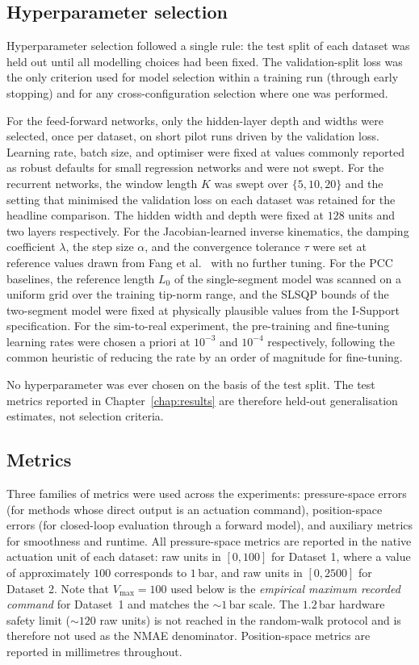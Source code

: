 \subsection{Hyperparameter selection}
\label{sec:hyperparam}

Hyperparameter selection followed a single rule: the test split of each dataset was held out until all modelling choices had been fixed. The validation-split loss was the only criterion used for model selection within a training run (through early stopping) and for any cross-configuration selection where one was performed.

For the feed-forward networks, only the hidden-layer depth and widths were selected, once per dataset, on short pilot runs driven by the validation loss. Learning rate, batch size, and optimiser were fixed at values commonly reported as robust defaults for small regression networks and were not swept. For the recurrent networks, the window length $K$ was swept over $\{5, 10, 20\}$ and the setting that minimised the validation loss on each dataset was retained for the headline comparison. The hidden width and depth were fixed at $128$ units and two layers respectively. For the Jacobian-learned inverse kinematics, the damping coefficient $\lambda$, the step size $\alpha$, and the convergence tolerance $\tau$ were set at reference values drawn from Fang et al.\ \cite{fang2022jacobian} with no further tuning. For the PCC baselines, the reference length $L_0$ of the single-segment model was scanned on a uniform grid over the training tip-norm range, and the SLSQP bounds of the two-segment model were fixed at physically plausible values from the I-Support specification. For the sim-to-real experiment, the pre-training and fine-tuning learning rates were chosen a priori at $10^{-3}$ and $10^{-4}$ respectively, following the common heuristic of reducing the rate by an order of magnitude for fine-tuning.

No hyperparameter was ever chosen on the basis of the test split. The test metrics reported in Chapter~\ref{chap:results} are therefore held-out generalisation estimates, not selection criteria.

\subsection{Metrics}
\label{sec:metrics}

Three families of metrics were used across the experiments: pressure-space errors (for methods whose direct output is an actuation command), position-space errors (for closed-loop evaluation through a forward model), and auxiliary metrics for smoothness and runtime. All pressure-space metrics are reported in the native actuation unit of each dataset: raw units in $[0, 100]$ for Dataset 1, where a value of approximately $100$ corresponds to $1$\,bar, and raw units in $[0, 2500]$ for Dataset 2. Note that $V_{\max} = 100$ used below is the \emph{empirical maximum recorded command} for Dataset~1 and matches the $\sim\!1$\,bar scale. The $1.2$\,bar hardware safety limit ($\sim\!120$ raw units) is not reached in the random-walk protocol and is therefore not used as the NMAE denominator. Position-space metrics are reported in millimetres throughout.

